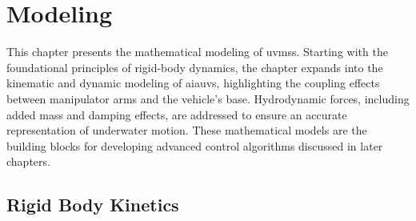 \chapter{Modeling}
\label{chap:modeling}

This chapter presents the mathematical modeling of \gls{uvms}s. Starting with the foundational 
principles of rigid-body dynamics, the chapter expands into the kinematic and 
dynamic modeling of \gls{aiauv}s, highlighting the coupling 
effects between manipulator arms and the vehicle's base. Hydrodynamic forces, 
including added mass and damping effects, are addressed to ensure an accurate 
representation of underwater motion. These mathematical models are the building
blocks for developing advanced control algorithms discussed in later chapters.

\section{Rigid Body Kinetics}

